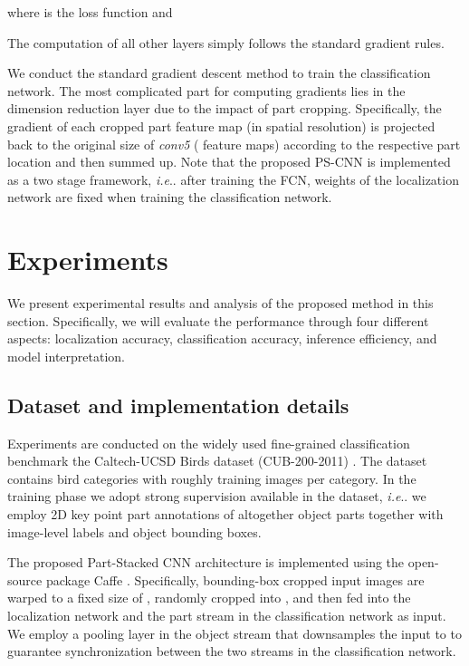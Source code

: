 \documentclass[10pt,twocolumn,letterpaper]{article}
\makeatletter
\DeclareRobustCommand\onedot{\futurelet\@let@token\@onedot}
\def\@onedot{\ifx\@let@token.\else.\null\fi\xspace}
\def\ie{\emph{i.e}\onedot} \def\Ie{\emph{I.e}\onedot}
\makeatother
\begin{document}
where  is the loss function and

The computation of all other layers simply follows the standard gradient rules.
\fi


We conduct the standard gradient descent method to train the classification network. The most complicated part for computing gradients lies in the dimension reduction layer due to the impact of part cropping. Specifically, the gradient of each cropped part feature map (in  spatial resolution) is projected back to the original size of \textit{conv5} ( feature maps) according to the respective part location and then summed up.
Note that the proposed PS-CNN is implemented as a two stage framework, \ie after training the FCN, weights of the localization network are fixed when training the classification network.








\section{Experiments}\label{sec:exp}
We present experimental results and analysis of the proposed method in this section. Specifically, we will evaluate the performance through four different aspects: localization accuracy, classification accuracy, inference efficiency, and model interpretation.

\subsection{Dataset and implementation details}
Experiments are conducted on the widely used fine-grained classification benchmark the Caltech-UCSD Birds dataset (CUB-200-2011) \cite{wah2011caltech}. The dataset contains  bird categories with roughly  training images per category. In the training phase we adopt strong supervision available in the dataset, \ie we employ 2D key point part annotations of altogether  object parts together with image-level labels and object bounding boxes.





The proposed Part-Stacked CNN architecture is implemented using the open-source package Caffe \cite{jia2014caffe}.
Specifically, bounding-box cropped input images are warped to a fixed size of , randomly cropped into , and then fed into the localization network and the part stream in the classification network as input. We employ a pooling layer in the object stream that downsamples the  input to  to guarantee synchronization between the two streams in the classification network.
\end{document}
